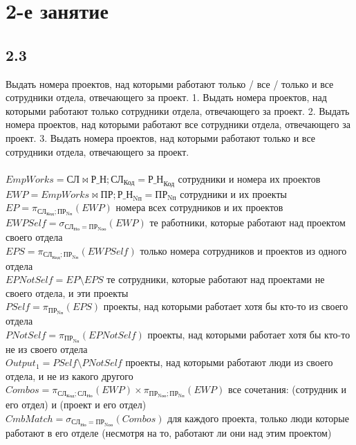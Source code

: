 \documentclass[12pt]{article}
\newcommand{\employee}{\textbf{СЛ}}
\newcommand{\project}{\textbf{ПР}}
\newcommand{\workson}{\textbf{Р\_Н}}
\newcommand{\employeeId}{\textbf{СЛ}_\text{Код}}
\newcommand{\employeeDepId}{\textbf{СЛ}_\text{Но}}
\newcommand{\projectId}{\textbf{ПР}_\text{Nп}}
\newcommand{\projectResponsibleDepId}{\textbf{ПР}_\text{Nоо}}
\newcommand{\worksonEmpId}{\textbf{Р\_Н}_\text{Код}}
\newcommand{\worksonProjId}{\textbf{Р\_Н}_\text{Nп}}
\newcommand{\filter}[2]{\sigma{}_{#1} \allowbreak \left( #2 \right)}
\newcommand{\join}[3]{ #1 \bowtie #2;\allowbreak #3 }
\newcommand{\select}[2]{\pi_{#1} \allowbreak \left( #2 \right)}
\begin{document}
\section{2-е занятие}
\subsection{2.3}
Выдать номера проектов, над которыми работают {только / все / только и все} сотрудники отдела, отвечающего за проект.
1. Выдать номера проектов, над которыми работают только сотрудники отдела, отвечающего за проект.
2. Выдать номера проектов, над которыми работают все сотрудники отдела, отвечающего за проект.
3. Выдать номера проектов, над которыми работают только и все сотрудники отдела, отвечающего за проект.\\\\
    $ EmpWorks = \join{\employee}{\workson}{\employeeId = \worksonEmpId}$ 
 сотрудники и номера их проектов \\ 
    $ EWP = \join{EmpWorks}{\project}{\worksonProjId = \projectId}$ 
 сотрудники и их проекты \\ 
    $ EP = \select{\employeeId; \projectId}{EWP}$ 
 номера всех сотрудников и их проектов \\ 
    $ EWPSelf = \filter{\employeeDepId = \projectResponsibleDepId}{EWP}$ 
 те работники, которые работают над проектом своего отдела \\ 
    $ EPS = \select{\employeeId; \projectId}{EWPSelf}$ 
 только номера сотрудников и проектов из одного отдела \\ 
    $ EPNotSelf = EP \setminus EPS$ 
 те сотрудники, которые работают над проектами не своего отдела, и эти проекты \\  
    $ PSelf = \select{\projectId}{EPS}$ 
 проекты, над которыми работает хотя бы кто-то из своего отдела \\ 
    $ PNotSelf = \select{\projectId}{EPNotSelf}$ 
 проекты, над которыми работает хотя бы кто-то не из своего отдела \\ 
    $ Output_1 = PSelf \setminus PNotSelf $ 
 проекты, над которыми работают люди из своего отдела, и не из какого другого \\ 
    $ Combos = \select{\employeeId; \employeeDepId}{EWP} \times \select{\projectResponsibleDepId; \projectId}{EWP} $ 
 все сочетания: (сотрудник и его отдел) и (проект и его отдел) \\ 
    $ CmbMatch = \filter{\employeeDepId = \projectResponsibleDepId}{Combos}$ 
 для каждого проекта, только люди которые работают в его отделе (несмотря на то, работают ли они над этим проектом) \\ 
\end{document}

